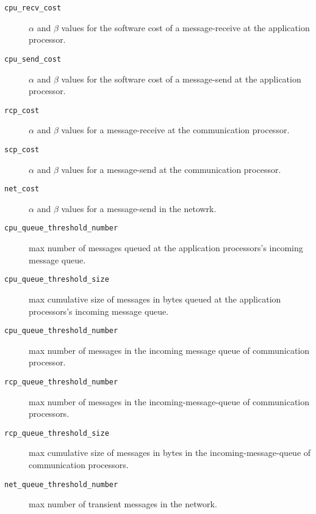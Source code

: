 \begin{description}

\item[{\tt cpu\_recv\_cost}] $\alpha$ and  $\beta$ values  for the software
                            cost of a message-receive at the application
                            processor.

\item[{\tt cpu\_send\_cost}] $\alpha$ and  $\beta$ values  for the software
                            cost of a message-send at the application
                            processor.

\item[{\tt rcp\_cost}] $\alpha$ and  $\beta$ values for a message-receive 
                       at the communication processor.

\item[{\tt scp\_cost}] $\alpha$ and  $\beta$ values for a message-send
                       at the communication processor.

\item[{\tt net\_cost}] $\alpha$ and  $\beta$ values for a message-send
                       in the netowrk.

\item[{\tt cpu\_queue\_threshold\_number}] max number of messages queued
                       at the application processors's incoming message queue.

\item[{\tt cpu\_queue\_threshold\_size}] max cumulative size of
		       messages in bytes queued at the application
		       processors's incoming message queue.


\item[{\tt cpu\_queue\_threshold\_number}] max number of messages in the incoming
                       message queue of communication processor.


\item[{\tt rcp\_queue\_threshold\_number}] max number of messages in the 
                       incoming-message-queue of communication processors.                    
\item[{\tt rcp\_queue\_threshold\_size}] max cumulative size of messages in bytes
                       in the incoming-message-queue of communication 
                       processors.

\item[{\tt net\_queue\_threshold\_number}] max number of transient messages in 
                       the network.


\end{description}
